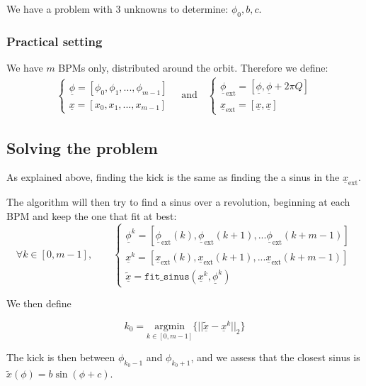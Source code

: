 \documentclass[12pt,a4paper]{article}
\renewcommand{\todo}[1]{}
\renewcommand{\vec}[1]{\underline{#1}}
\begin{document}
	We have a problem with 3 unknowns to determine: $\phi_0, b, c$. 
	
	\subsubsection{Practical setting}
	
	We have $m$ BPMs only, distributed around the orbit.
	Therefore we define:
	\begin{align}
		\begin{cases}
			\vec{\phi} = [\phi_0, \phi_1, ..., \phi_{m-1}] \\
			\vec{x} = [x_0, x_1, ..., x_{m-1}]
		\end{cases} \quad \mathrm{and} \quad
		\begin{cases}
			\vec{\phi}_\mathrm{ext} = [\vec{\phi}, \vec{\phi}+2\pi Q ]\\
			\vec{x}_\mathrm{ext} = [\vec{x}, \vec{x}]
		\end{cases}
	\end{align}
	
	\subsection{Solving the problem}

	\todo{not well said}
	As explained above, finding the kick is the same as finding the a sinus in the $\vec{x}_\mathrm{ext}$.
	
	The algorithm will then try to find a sinus over a revolution, beginning at each BPM and keep the one that fit at best:
	\begin{equation}
		\forall k \in [0, m-1], \qquad
			\begin{cases}
				\vec{\phi}^k = [\vec{\phi}_\mathrm{ext}(k), \vec{\phi}_\mathrm{ext}(k+1), ... \vec{\phi}_\mathrm{ext}(k+m-1)]\\
				\vec{x}^k = [\vec{x}_\mathrm{ext}(k), \vec{x}_\mathrm{ext}(k+1), ... \vec{x}_\mathrm{ext}(k+m-1)]\\
				\tilde{\vec{x}} = \mathtt{fit\_sinus}(\vec{x}^k, \vec{\phi}^k)
			\end{cases}
	\end{equation}
	
	We then define
	
	\begin{equation}
		k_0 = \underset{k \in [0, m-1]}{\textrm{argmin}}\{||\tilde{\vec{x}}-\vec{x}^k||_2\}
	\end{equation}
	
	The kick is then between $\phi_{k_0-1}$ and $\phi_{k_0+1}$\todo{The code doesn't do that for now}, and we assess that the closest sinus is $\tilde{x}(\phi) = b \sin(\phi + c) $.
	
\end{document}
